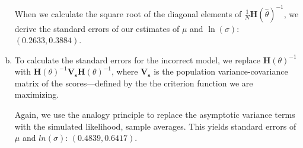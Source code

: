 \documentclass[11pt]{article}
\begin{document}
\begin{enumerate}[a)]
	When we calculate the square root of the diagonal elements of $\frac{1}{N}\mathbf{H}(\hat \theta)^{-1}$, we derive the standard errors of our estimates of $\mu$ and $\ln(\sigma)$: $(0.2633,0.3884)$.
	
	\item To calculate the standard errors for the incorrect model, we replace $\mathbf{H}(\theta)^{-1}$ with $\mathbf{H}(\theta)^{-1}\mathbf{V_s}\mathbf{H}(\theta)^{-1}$, where $\mathbf{V_s}$ is the population variance-covariance matrix of the scores---defined by the the criterion function we are maximizing. 

	Again, we use the analogy principle to replace the asymptotic variance terms with the simulated likelihood, sample averages. This yields standard errors of $\mu$ and $ln(\sigma)$: $(0.4839,0.6417)$.

\end{enumerate}
\end{document}
